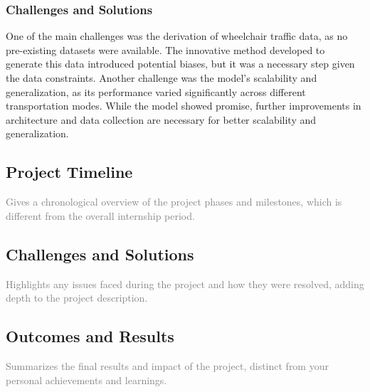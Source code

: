 \subsubsection{Challenges and Solutions}\label{subsubsec:challenges-and-solutions}
One of the main challenges was the derivation of wheelchair traffic data, as no pre-existing datasets were available.
The innovative method developed to generate this data introduced potential biases, but it was a necessary step given the
data constraints.
Another challenge was the model's scalability and generalization, as its performance varied significantly across
different transportation modes.
While the model showed promise, further improvements in architecture and data collection are necessary for better
scalability and generalization.

\subsection{Project Timeline}\label{subsec:project-timeline}
\textcolor{gray}
{Gives a chronological overview of the project phases and milestones, which is different from the overall internship
period.
}

\subsection{Challenges and Solutions}\label{subsec:challenges-and-solutions}
\textcolor{gray}
{Highlights any issues faced during the project and how they were resolved, adding depth to the project description.
}

\subsection{Outcomes and Results}\label{subsec:outcomes-and-results}
\textcolor{gray}
{Summarizes the final results and impact of the project, distinct from your personal achievements and learnings.}
